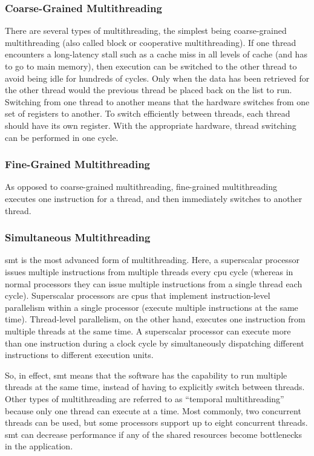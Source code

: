 \documentclass[10pt]{article}
\begin{document}
\begin{flushleft}
\subsubsection{Coarse-Grained Multithreading}
There are several types of multithreading, the simplest being coarse-grained multithreading (also called block or cooperative multithreading). If one thread encounters a long-latency stall such as a cache miss in all levels of cache (and has to go to main memory), then execution can be switched to the other thread to avoid being idle for hundreds of cycles. Only when the data has been retrieved for the other thread would the previous thread be placed back on the list to run. Switching from one thread to another means that the hardware switches from one set of registers to another. To switch efficiently between threads, each thread should have its own register. With the appropriate hardware, thread switching can be performed in one cycle. 

\subsubsection{Fine-Grained Multithreading}
As opposed to coarse-grained multithreading, fine-grained multithreading executes one instruction for a thread, and then immediately switches to another thread. 

\subsubsection{Simultaneous Multithreading}
\gls{smt} is the most advanced form of multithreading. Here, a superscalar processor issues multiple instructions from multiple threads every \gls{cpu} cycle (whereas in normal processors they can issue multiple instructions from a single thread each cycle). Superscalar processors are \gls{cpu}s that implement instruction-level parallelism within a single processor (execute multiple instructions at the same time). Thread-level parallelism, on the other hand, executes one instruction from multiple threads at the same time. A superscalar processor can execute more than one instruction during a clock cycle by simultaneously dispatching different instructions to different execution units. 

So, in effect, \gls{smt} means that the software has the capability to run multiple threads at the same time, instead of having to explicitly switch between threads. Other types of multithreading are referred to as ``temporal multithreading'' because only one thread can execute at a time. Most commonly, two concurrent threads can be used, but some processors support up to eight concurrent threads. \gls{smt} can decrease performance if any of the shared resources become bottlenecks in the application. 


\end{flushleft}
\end{document}
